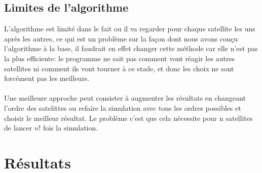 \documentclass[11pt]{article}
\begin{document}
	\subsection{Limites de l'algorithme} %
	\label{sub:limites_de_l_algorithme}

		L'algorithme est limité dans le fait ou il va regarder pour chaque satellite les uns après les autres, ce qui est un problème sur la façon dont nous avons conçu l'algorithme à la base, il faudrait en effet changer cette méthode car elle n'est pas la plus efficiente: le programme ne sait pas comment vont réagir les autres satellites ni comment ils vont tourner à ce stade, et donc les choix ne sont forcément pas les meilleurs.
		\\
		\\
		Une meilleure approche peut consister à augmenter les résultats en changeant l'ordre des satelittes ou refaire la simulation avec tous les ordres possibles et choisir le meilleur résultat. Le problème c'est que cela nécessite pour n satellites de lancer $n!$ fois la simulation.

	\section{Résultats} %
	\label{sec:résultats}
	
\end{document}
